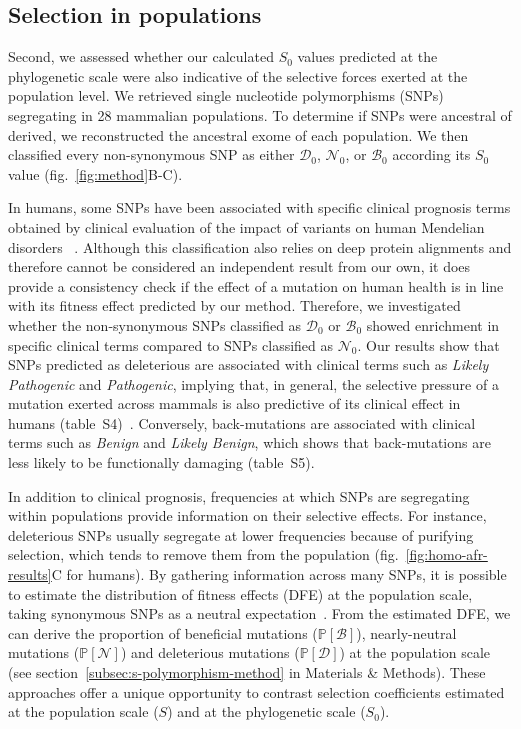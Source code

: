 \documentclass[9pt,twocolumn,twoside,lineno]{pnas-new}
\newcommand{\proba}{\mathbb{P}}
\newcommand{\Sphy}{S_{0}}
\newcommand{\SphyDel}{\mathcal{D}_0}
\newcommand{\SphyNeu}{\mathcal{N}_0}
\newcommand{\SphyBen}{\mathcal{B}_0}
\newcommand{\Spop}{S}
\newcommand{\SpopDel}{\mathcal{D}}
\newcommand{\SpopNeu}{\mathcal{N}}
\newcommand{\SpopBen}{\mathcal{B}}
\newcommand{\ProbaPopDel}{\proba [ \SpopDel]}
\newcommand{\ProbaPopNeu}{\proba [ \SpopNeu ]}
\newcommand{\ProbaPopBen}{\proba [ \SpopBen ]}
\begin{document}
\subsection*{Selection in populations}
Second, we assessed whether our calculated $\Sphy$ values predicted at the phylogenetic scale were also indicative of the selective forces exerted at the population level.
We retrieved single nucleotide polymorphisms (SNPs) segregating in 28 mammalian populations.
To determine if SNPs were ancestral of derived, we reconstructed the ancestral exome of each population.
We then classified every non-synonymous SNP as either $\SphyDel$, $\SphyNeu$, or $\SphyBen$ according its $\Sphy$ value (fig.~\ref{fig:method}B-C).

In humans, some SNPs have been associated with specific clinical prognosis terms obtained by clinical evaluation of the impact of variants on human Mendelian disorders ~\cite{landrum_clinvar_2018}.
Although this classification also relies on deep protein alignments and therefore cannot be considered an independent result from our own, it does provide a consistency check if the effect of a mutation on human health is in line with its fitness effect predicted by our method.
Therefore, we investigated whether the non-synonymous SNPs classified as $\SphyDel$ or $\SphyBen$ showed enrichment in specific clinical terms compared to SNPs classified as $\SphyNeu$.
Our results show that SNPs predicted as deleterious are associated with clinical terms such as \textit{Likely Pathogenic} and \textit{Pathogenic}, implying that, in general, the selective pressure of a mutation exerted across mammals is also predictive of its clinical effect in humans (table~S4)~\cite{sullivan_leveraging_2023}.
Conversely, back-mutations are associated with clinical terms such as \textit{Benign} and \textit{Likely Benign}, which shows that back-mutations are less likely to be functionally damaging (table~S5).

In addition to clinical prognosis, frequencies at which SNPs are segregating within populations provide information on their selective effects.
For instance, deleterious SNPs usually segregate at lower frequencies because of purifying selection, which tends to remove them from the population (fig.~\ref{fig:homo-afr-results}C for humans).
By gathering information across many SNPs, it is possible to estimate the distribution of fitness effects (DFE) at the population scale, taking synonymous SNPs as a neutral expectation~\cite{eyre-walker_distribution_2006, eyre-walker_estimating_2009, galtier_adaptive_2016, tataru_inference_2017}.
From the estimated DFE, we can derive the proportion of beneficial mutations ($\ProbaPopBen$), nearly-neutral mutations ($\ProbaPopNeu$) and deleterious mutations ($\ProbaPopDel$) at the population scale (see section~\ref{subsec:s-polymorphism-method} in Materials \& Methods).
These approaches offer a unique opportunity to contrast selection coefficients estimated at the population scale ($\Spop$) and at the phylogenetic scale ($\Sphy$).
\end{document}
